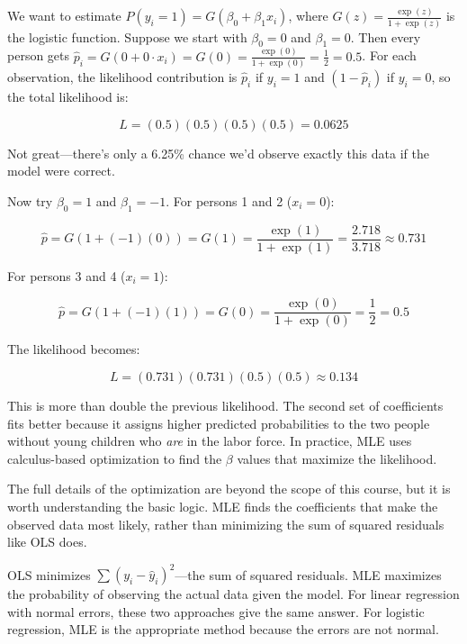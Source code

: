 \documentclass[
  letterpaper,
  DIV=11,
  numbers=noendperiod]{scrreprt}
\begin{document}
We want to estimate \(P(y_i = 1) = G(\beta_0 + \beta_1 x_i)\), where
\(G(z) = \frac{\exp(z)}{1 + \exp(z)}\) is the logistic function. Suppose
we start with \(\beta_0 = 0\) and \(\beta_1 = 0\). Then every person
gets
\(\hat{p}_i = G(0 + 0 \cdot x_i) = G(0) = \frac{\exp(0)}{1 + \exp(0)} = \frac{1}{2} = 0.5\).
For each observation, the likelihood contribution is \(\hat{p}_i\) if
\(y_i = 1\) and \((1 - \hat{p}_i)\) if \(y_i = 0\), so the total
likelihood is:

\[L = (0.5)(0.5)(0.5)(0.5) = 0.0625\]

Not great---there's only a 6.25\% chance we'd observe exactly this data
if the model were correct.

Now try \(\beta_0 = 1\) and \(\beta_1 = -1\). For persons 1 and 2
(\(x_i = 0\)):

\[\hat{p} = G(1 + (-1)(0)) = G(1) = \frac{\exp(1)}{1 + \exp(1)} = \frac{2.718}{3.718} \approx 0.731\]

For persons 3 and 4 (\(x_i = 1\)):

\[\hat{p} = G(1 + (-1)(1)) = G(0) = \frac{\exp(0)}{1 + \exp(0)} = \frac{1}{2} = 0.5\]

The likelihood becomes:

\[L = (0.731)(0.731)(0.5)(0.5) \approx 0.134\]

This is more than double the previous likelihood. The second set of
coefficients fits better because it assigns higher predicted
probabilities to the two people without young children who \emph{are} in
the labor force. In practice, MLE uses calculus-based optimization to
find the \(\beta\) values that maximize the likelihood.

The full details of the optimization are beyond the scope of this
course, but it is worth understanding the basic logic. MLE finds the
coefficients that make the observed data most likely, rather than
minimizing the sum of squared residuals like OLS does.

\begin{tcolorbox}[enhanced jigsaw, arc=.35mm, bottomrule=.15mm, bottomtitle=1mm, breakable, colback=white, colbacktitle=quarto-callout-note-color!10!white, colframe=quarto-callout-note-color-frame, coltitle=black, left=2mm, leftrule=.75mm, opacityback=0, opacitybacktitle=0.6, rightrule=.15mm, title=\textcolor{quarto-callout-note-color}{\faInfo}\hspace{0.5em}{OLS vs.~MLE: Two Different Objectives}, titlerule=0mm, toprule=.15mm, toptitle=1mm]

OLS minimizes \(\sum(y_i - \hat{y}_i)^2\)---the sum of squared
residuals. MLE maximizes the probability of observing the actual data
given the model. For linear regression with normal errors, these two
approaches give the same answer. For logistic regression, MLE is the
appropriate method because the errors are not normal.

\end{tcolorbox}
\end{document}
